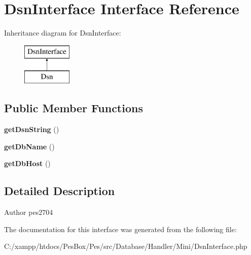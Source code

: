 \hypertarget{interface_pes_1_1_database_1_1_handler_1_1_mini_1_1_dsn_interface}{}\section{Dsn\+Interface Interface Reference}
\label{interface_pes_1_1_database_1_1_handler_1_1_mini_1_1_dsn_interface}
Inheritance diagram for Dsn\+Interface\+:\begin{figure}[H]
\begin{center}
\leavevmode
\includegraphics[height=2.000000cm]{interface_pes_1_1_database_1_1_handler_1_1_mini_1_1_dsn_interface}
\end{center}
\end{figure}
\subsection*{Public Member Functions}
\begin{DoxyCompactItemize}
\item 
\mbox{\label{interface_pes_1_1_database_1_1_handler_1_1_mini_1_1_dsn_interface_a0709987536a81514c569d8ff4131c283}} 
{\bfseries get\+Dsn\+String} ()
\item 
\mbox{\label{interface_pes_1_1_database_1_1_handler_1_1_mini_1_1_dsn_interface_a4949c3e4d80c0d275c80e0c1c3b5b280}} 
{\bfseries get\+Db\+Name} ()
\item 
\mbox{\label{interface_pes_1_1_database_1_1_handler_1_1_mini_1_1_dsn_interface_ad855d2dfa322f4566b89fcc00fd0e282}} 
{\bfseries get\+Db\+Host} ()
\end{DoxyCompactItemize}


\subsection{Detailed Description}
\begin{DoxyAuthor}{Author}
pes2704 
\end{DoxyAuthor}


The documentation for this interface was generated from the following file\+:\begin{DoxyCompactItemize}
\item 
C\+:/xampp/htdocs/\+Pes\+Box/\+Pes/src/\+Database/\+Handler/\+Mini/Dsn\+Interface.\+php\end{DoxyCompactItemize}
